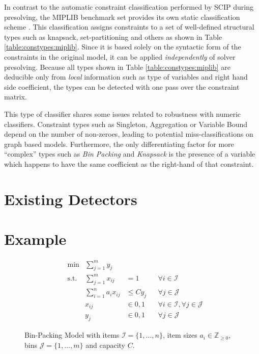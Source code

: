 				In contrast to the automatic constraint classification performed by SCIP during presolving, the MIPLIB benchmark set provides its own static classification scheme \cite{gleixnerMIPLIB2017Datadriven2021a}. This classification assigns constraints to a set of well-defined structural types such as knapsack, set-partitioning and others as shown in Table \ref{table:constypes:miplib}. Since it is based solely on the syntactic form of the constraints in the original model, it can be applied \textit{independently} of solver presolving.
				Because all types shown in Table \ref{table:constypes:miplib} are deducible only from \textit{local} information such as type of variables and right hand side coefficient, the types can be detected with one pass over the constraint matrix.
				
				This type of classifier shares some issues related to robustness with numeric classifiers.
				Constraint types such as Singleton, Aggregation or Variable Bound depend on the number of non-zeroes, leading to potential miss-classifications on graph based models.
				Furthermore, the only differentiating factor for more \enquote{complex} types such as \textit{Bin Packing} and \textit{Knapsack} is the presence of a variable which happens to have the same coefficient as the right-hand of that constraint.
				
				
	
				\clearpage
	
	\section{Existing Detectors}
	
		\clearpage
	
	\section{Example}
	\label{chap:gcg:example}
		
				\begin{figure}[ht!]
			\centering
			\begin{align}
				&\min &\sum_{j=1}^m y_j \nonumber \\
				&\text{s.t.} &\sum_{j=1}^m x_{ij} &= 1 &&\forall i \in \mathcal{I} \label{eq:gcg:example:link} \\
				&& \sum_{i=1}^n a_i x_{ij} &\leq C y_j && \forall j \in \mathcal{J} \label{eq:gcg:example:capacity} \\
				&& x_{ij} &\in { 0, 1 } && \forall i \in \mathcal{I}, \forall j \in \mathcal{J} \nonumber \\
				&& y_j &\in { 0, 1 } && \forall j \in \mathcal{J} \nonumber
			\end{align}
			\caption{Bin-Packing Model with items $\mathcal{I} = \{ 1, \ldots, n \}$, item sizes $a_i \in \mathbb{Z}_{\geq 0}$, bins $\mathcal{J} = \{ 1, \ldots, m \}$ and capacity $C$.}
			\label{figure:gcg:example:binpack}
		\end{figure}
		

